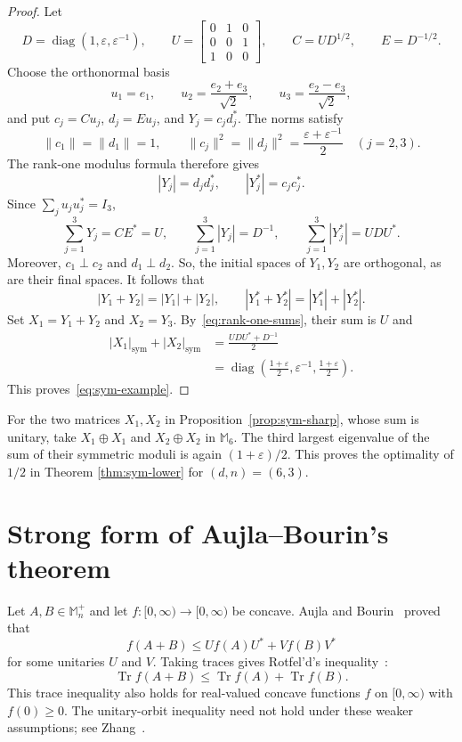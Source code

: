 \documentclass[11pt]{amsart}
\numberwithin{equation}{section}
\newcommand{\Mnp}{\mathbb M_n^+}
\newcommand{\Tr}{\operatorname{Tr}}
\newcommand{\diag}{\operatorname{diag}}
\newcommand{\norm}[1]{\lVert #1\rVert}
\newcommand{\smod}[1]{\lvert #1\rvert_{\mathrm{sym}}}
\begin{document}
\begin{proof}
Let
\[
 D=\diag(1,\varepsilon,\varepsilon^{-1}),
 \qquad
 U=\begin{bmatrix}0&1&0\\0&0&1\\1&0&0\end{bmatrix},
 \qquad
 C=UD^{1/2},
 \qquad E=D^{-1/2}.
\]
Choose the orthonormal basis
\[
 u_1=e_1,
 \qquad
 u_2=\frac{e_2+e_3}{\sqrt2},
 \qquad
 u_3=\frac{e_2-e_3}{\sqrt2},
\]
and put $c_j=Cu_j$, $d_j=Eu_j$, and $Y_j=c_jd_j^*$. The norms satisfy
\[
 \norm{c_1}=\norm{d_1}=1,
 \qquad
 \norm{c_j}^2=\norm{d_j}^2
 =\frac{\varepsilon+\varepsilon^{-1}}2
 \quad(j=2,3).
\]
The rank-one modulus formula therefore gives
\[
 |Y_j|=d_jd_j^*,
 \qquad
 |Y_j^*|=c_jc_j^*.
\]
Since $\sum_ju_ju_j^*=I_3$,
\begin{equation}\label{eq:rank-one-sums}
 \sum_{j=1}^3Y_j=CE^*=U,
 \qquad
 \sum_{j=1}^3|Y_j|=D^{-1},
 \qquad
 \sum_{j=1}^3|Y_j^*|=UDU^*.
\end{equation}
Moreover, $c_1\perp c_2$ and $d_1\perp d_2$. So, the initial spaces of $Y_1,Y_2$ are orthogonal, as are their final spaces. It follows that
\[
 |Y_1+Y_2|=|Y_1|+|Y_2|,
 \qquad
 |Y_1^*+Y_2^*|=|Y_1^*|+|Y_2^*|.
\]
Set $X_1=Y_1+Y_2$ and $X_2=Y_3$. By~\eqref{eq:rank-one-sums}, their sum is $U$ and
\begin{align*}
 \smod{X_1}+\smod{X_2}
 &=\frac{UDU^*+D^{-1}}2\\
 &=\diag\left(\frac{1+\varepsilon}{2},
               \varepsilon^{-1},
               \frac{1+\varepsilon}{2}\right).
\end{align*}
This proves~\eqref{eq:sym-example}.
\end{proof}

For the two matrices $X_1,X_2$ in Proposition~\ref{prop:sym-sharp}, whose sum is unitary, take
$X_1\oplus X_1$ and $X_2\oplus X_2$ in $\mathbb M_6$. The third largest eigenvalue of the sum of their symmetric moduli is again $(1+\varepsilon)/2$. This proves the optimality of $1/2$ in Theorem \ref{thm:sym-lower} for $(d,n)=(6,3)$.





\section{Strong form of Aujla--Bourin's theorem}
\label{sec:double}

Let $A,B\in\Mnp$ and let $f:[0,\infty)\to[0,\infty)$ be concave.  Aujla and Bourin~\cite[Theorem~2.1]{AB} proved that
$$
f(A+B) \le Uf(A)U^*+Vf(B)V^*
$$
for some unitaries $U$ and $V$. Taking traces gives
Rotfel'd's inequality~\cite{Rot69}:
\begin{equation}\label{Rot}
\Tr f(A+B) \le \Tr f(A) + \Tr f(B).
\end{equation}
This trace inequality also holds for real-valued concave
functions $f$ on $[0,\infty)$ with $f(0)\geq0$.
The unitary-orbit inequality need not hold under these weaker
assumptions; see Zhang~\cite{TZhang26b}.
\end{document}
